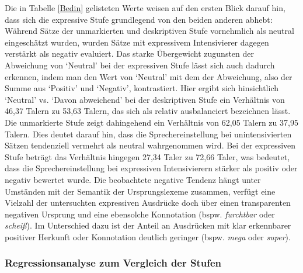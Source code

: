 %
\noindent Die in Tabelle \ref{Bedin} gelisteten Werte weisen auf den ersten Blick darauf hin, dass sich die expressive Stufe grundlegend von den beiden anderen abhebt: Während Sätze der unmarkierten und deskriptiven Stufe vornehmlich als neutral eingeschätzt wurden, wurden Sätze mit expressivem Intensivierer dagegen verstärkt als negativ evaluiert. Das starke Übergewicht zugunsten der Abweichung von `Neutral' bei der expressiven Stufe lässt sich auch dadurch erkennen, indem man den Wert von `Neutral' mit dem der Abweichung, also der Summe aus `Positiv' und `Negativ', kontrastiert. Hier ergibt sich hinsichtlich `Neutral' vs. `Davon abweichend' bei der deskriptiven Stufe ein Verhältnis von 46,37 Talern zu 53,63 Talern, das sich als relativ ausbalanciert bezeichnen lässt. Die unmarkierte Stufe zeigt dahingehend ein Verhältnis von 62,05 Talern zu 37,95 Talern. Dies deutet darauf hin, dass die Sprechereinstellung bei unintensivierten Sätzen tendenziell vermehrt als neutral wahrgenommen wird. Bei der expressiven Stufe beträgt das Verhältnis hingegen 27,34 Taler zu 72,66 Taler, was bedeutet, dass die Sprechereinstellung bei expressiven Intensivierern stärker als positiv oder negativ bewertet wurde. Die beobachtete negative Tendenz hängt unter Umständen mit der Semantik der Ursprungslexeme zusammen, verfügt eine Vielzahl der untersuchten expressiven Ausdrücke doch über einen transparenten negativen Ursprung und eine ebensolche Konnotation (bspw. \textit{furchtbar} oder \textit{scheiß}). Im Unterschied dazu ist der Anteil an Ausdrücken mit klar erkennbarer positiver Herkunft oder Konnotation deutlich geringer (bspw. \textit{mega} oder \textit{super}).




\subsubsection{Regressionsanalyse zum Vergleich der Stufen} \label{abs:VP-Vergleich669}


